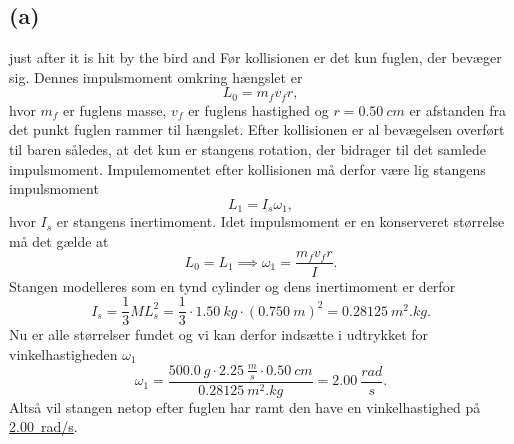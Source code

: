\documentclass[12pt]{article}
\theoremstyle{definition}
\begin{document}
\subsection*{(a)}
just after it is hit by the bird and
\bigbreak
Før kollisionen er det kun fuglen, der bevæger sig. Dennes impulsmoment omkring hængslet er
\[ 
L_0 = m_f v_f r
,\]
hvor $m_f$ er fuglens masse, $v_f$ er fuglens hastighed og $r = \qty{0,50}{cm}$ er afstanden fra det punkt fuglen rammer til hængslet. Efter kollisionen er al bevægelsen overført til baren således, at det kun er stangens rotation, der bidrager til det samlede impulsmoment. Impulemomentet efter kollisionen må derfor være lig stangens impulsmoment
\[ 
L_1 = I_s\omega_1
,\]
hvor $I_s$ er stangens inertimoment. Idet impulsmoment er en konserveret størrelse må det gælde at
\[ 
L_0 = L_1 \implies \omega_1 = \frac{m_fv_fr}{I} 
.\]
Stangen modelleres som en tynd cylinder og dens inertimoment er derfor
\[ 
  I_{s} = \frac{1}{3} ML_s^2 = \frac{1}{3} \cdot \qty{1,50}{kg} \cdot (\qty{0,750}{m})^2 = \qty{0,28125}{m^2.kg} 
.\]
Nu er alle størrelser fundet og vi kan derfor indsætte i udtrykket for vinkelhastigheden $\omega_1$
\[ 
\omega_1 = \frac{\qty{500,0}{g} \cdot \qty{2,25}{\frac{m}{s}} \cdot \qty{0,50}{cm}}{\qty{0,28125}{m^2.kg}} = \qty{2,00}{\frac{rad}{s}} 
.\]
Altså vil stangen netop efter fuglen har ramt den have en vinkelhastighed på \underline{\underline{\qty{2,00}{rad/s}}}. 
\end{document}
